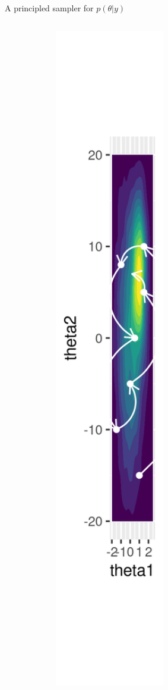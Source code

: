 \documentclass[bigger]{beamer}
\begin{document}
\begin{frame}[label={sec:org2454474}]{A principled sampler for \(p(\theta|y)\)}
\begin{columns}
\begin{column}{0.2\columnwidth}
\begin{center}
\includegraphics[width=0.7\textwidth]{./figure/sampler_path2.png}
\end{center}
\end{column}
\end{columns}
\end{frame}
\end{document}
